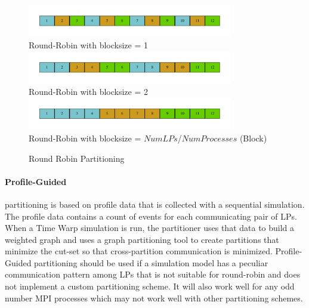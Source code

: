 \documentclass[11pt]{book}
\begin{document}
\begin{figure}
  \begin{center}
    \includegraphics[width=0.8\textwidth,keepaspectratio,quiet]{figs/graphviz/round_robin_partitioning.pdf} \\
    Round-Robin with blocksize = 1 \\
    \includegraphics[width=0.8\textwidth,keepaspectratio,quiet]{figs/graphviz/block_rr_partitioning.pdf} \\
    Round-Robin with blocksize = 2 \\
    \includegraphics[width=0.8\textwidth,keepaspectratio,quiet]{figs/graphviz/block_partitioning.pdf} \\
    Round-Robin with blocksize = $NumLPs$/$NumProcesses$ (Block) \\
  \end{center}
  \caption{Round Robin Partitioning}\label{round_robin_partitioning}
\end{figure}

\paragraph{Profile-Guided} partitioning is based on profile data that is collected with a
sequential simulation.  The profile data contains a count of events for each communicating pair
of LPs.  When a Time Warp simulation is run, the partitioner uses that data to build a weighted
graph and uses a graph partitioning tool to create partitions that minimize the cut-set so that
cross-partition communication is minimized.  Profile-Guided partitioning should be used if
a simulation model has a peculiar communication pattern among LPs that is not suitable for round-robin
and does not implement a custom partitioning scheme.  It will also work well for any odd number
MPI processes which may not work well with other partitioning schemes.
\end{document}
